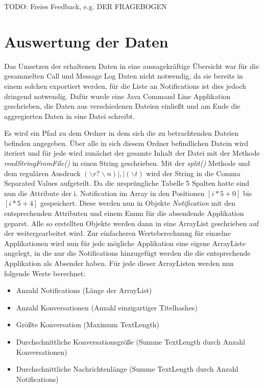 TODO: Freies Feedback, e.g. DER FRAGEBOGEN

\section{Auswertung der Daten}

Das Umsetzen der erhaltenen Daten in eine aussagekräftige Übersicht war für die gesammelten Call und Message Log Daten nicht notwendig, da sie bereits in einem solchen exportiert werden, für die Liste an Notifications ist dies jedoch dringend notwendig.
Dafür wurde eine Java Command Line Applikation geschrieben, die Daten aus verschiedenen Dateien einließt und am Ende die aggregierten Daten in eine Datei schreibt.
\par
Es wird ein Pfad zu dem Ordner in dem sich die zu betrachtenden Dateien befinden angegeben.
Über alle in sich diesem Ordner befindlichen Datein wird iteriert und für jede wird zunächst der gesamte Inhalt der Datei mit der Methode \emph{readStringFromFile()} in einen String geschrieben.
Mit der \emph{split()} Methode und dem regulären Ausdruck  $(\backslash r?\backslash n)|,|(\backslash t)$ wird der String in die Comma Separated Values aufgeteilt.
Da die ursprüngliche Tabelle 5 Spalten hatte sind nun die Attribute der i. Notification im Array in den Positionen $ [i * 5 + 0]$ bis $ [i * 5 + 4]$ gespeichert.
Diese werden nun in Objekte \emph{Notification} mit den entsprechenden Attributen und einem Enum für die absendende Applikation geparst.
Alle so erstellten Objekte werden dann in eine ArrayList geschrieben auf der weitergearbeitet wird.
Zur einfacheren Werteberechnung für einzelne Applikationen wird nun für jede mögliche Applikation eine eigene ArrayListe angelegt, in die nur die Notifications hinzugefügt werden die die entsprechende Applikation als Absender haben.
Für jede dieser ArrayListen werden nun folgende Werte berechnet:

\begin{itemize}
  \item Anzahl Notifications (Länge der ArrayList)
  \item Anzahl Konversationen (Anzahl einzigartiger Titelhashes)
  \item Größte Konversation (Maximum TextLength)
  \item Durchschnittliche Konversationsgröße (Summe TextLength durch Anzahl Konversationen)
  \item Durchschnittliche Nachrichtenlänge (Summe TextLength durch Anzahl Notifications)
\end{itemize}

